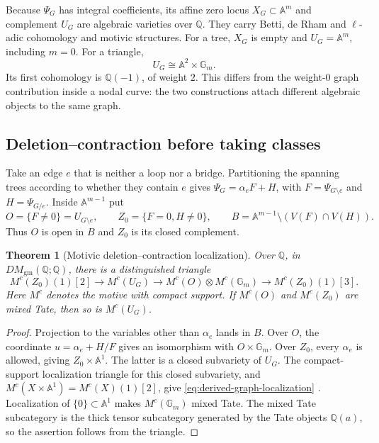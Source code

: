 \documentclass[11pt]{article}
\newtheorem{theorem}{Theorem}[section]
\theoremstyle{definition}
\theoremstyle{remark}
\newcommand{\Q}{\mathbb Q}
\newcommand{\A}{\mathbb A}
\begin{document}
Because $\Psi_G$ has integral coefficients, its affine zero locus
$X_G\subset\mathbb A^m$ and complement $U_G$ are algebraic varieties
over $\Q$.  They carry Betti, de Rham and $\ell$-adic cohomology and
motivic structures.  For a tree, $X_G$ is empty and
$U_G=\mathbb A^m$, including $m=0$.  For a triangle,
\[
  U_G\cong\mathbb A^2\times\mathbb G_m.
\]
Its first cohomology is $\Q(-1)$, of weight $2$.  This differs from the
weight-$0$ graph contribution inside a nodal curve: the two constructions
attach different algebraic objects to the same graph.

\subsection{Deletion--contraction before taking classes}
\label{sec:derived-graph-localization}

Take an edge $e$ that is neither a loop nor a bridge. Partitioning the
spanning trees according to whether they contain $e$ gives
$\Psi_G=\alpha_eF+H$, with $F=\Psi_{G\setminus e}$ and $H=\Psi_{G/e}$.
Inside $\A^{m-1}$ put
\[
 O=\{F\ne0\}=U_{G\setminus e},\qquad
 Z_0=\{F=0,H\ne0\},\qquad
 B=\A^{m-1}\setminus(V(F)\cap V(H)).
\]
Thus $O$ is open in $B$ and $Z_0$ is its closed complement.

\begin{theorem}[Motivic deletion--contraction localization]
\label{thm:derived-graph-localization}
Over $\Q$, in $DM_{\mathrm{gm}}(\Q;\Q)$, there is a distinguished triangle
\begin{equation}\label{eq:derived-graph-localization}
 M^c(Z_0)(1)[2]\longrightarrow M^c(U_G)
 \longrightarrow M^c(O)\otimes M^c(\mathbb G_m)
 \longrightarrow M^c(Z_0)(1)[3].
\end{equation}
Here $M^c$ denotes the motive with compact support. If $M^c(O)$ and
$M^c(Z_0)$ are mixed Tate, then so is $M^c(U_G)$.
\end{theorem}

\begin{proof}
Projection to the variables other than $\alpha_e$ lands in $B$. Over
$O$, the coordinate $u=\alpha_e+H/F$ gives an isomorphism with
$O\times\mathbb G_m$. Over $Z_0$, every $\alpha_e$ is allowed, giving
$Z_0\times\A^1$. The latter is a closed subvariety of $U_G$.
The compact-support localization triangle for this closed subvariety,
and $M^c(X\times\A^1)=M^c(X)(1)[2]$, give
\eqref{eq:derived-graph-localization}
\cite[Propositions 4.1.5--4.1.7, Corollary 4.1.8]{dagVoevodsky2000}.
Localization of $\{0\}\subset\A^1$ makes $M^c(\mathbb G_m)$ mixed Tate.
The mixed Tate subcategory is the thick tensor subcategory generated by
the Tate objects $\Q(a)$, so the assertion follows from the triangle.
\end{proof}
\end{document}
